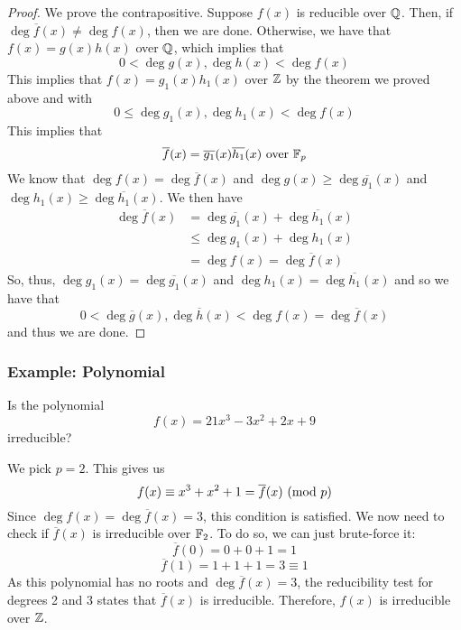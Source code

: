 \documentclass[letterpaper]{article}
\begin{document}
\begin{mdframed}[]
    \begin{proof}
        We prove the contrapositive. Suppose $f(x)$ is reducible over $\mathbb{Q}$. Then, if $\deg \overline{f}(x) \neq \deg f(x)$, then we are done. Otherwise, we have that $f(x) = g(x) h(x)$ over $\mathbb{Q}$, which implies that 
        \[0 < \deg g(x), \deg h(x) < \deg f(x)\]
        This implies that $f(x) = g_1 (x) h_1 (x)$ over $\mathbb{Z}$ by the theorem we proved above and with
        \[0 \leq \deg g_1 (x), \deg h_1 (x) < \deg f(x)\]
        This implies that 
        \[\overline{f}(x) = \overline{g_1}(x) \overline{h_1}(x) \text{ over } \mathbb{F}_p\]
        We know that $\deg f(x) = \deg \overline{f}(x)$ and $\deg g(x) \geq \deg \overline{g_1}(x)$ and $\deg h_1 (x) \geq \deg \overline{h_1}(x)$. We then have 
        \begin{equation*}
            \begin{aligned}
                \deg \overline{f}(x) &= \deg \overline{g_1}(x) + \deg \overline{h_1}(x) \\ 
                    &\leq \deg g_1 (x) + \deg h_1 (x) \\ 
                    &= \deg f(x) = \deg \overline{f}(x)
            \end{aligned}
        \end{equation*}
        So, thus, $\deg g_1 (x) = \deg \overline{g_1}(x)$ and $\deg h_1 (x) = \deg \overline{h_1}(x)$ and so we have that 
        \[0 < \deg \overline{g}(x), \deg \overline{h}(x) < \deg f(x) = \deg \overline{f}(x)\]
        and thus we are done. 
    \end{proof}
\end{mdframed}

\subsubsection{Example: Polynomial}
Is the polynomial
\[f(x) = 21x^3 - 3x^2 + 2x + 9\]
irreducible?

\begin{mdframed}[]
    We pick $p = 2$. This gives us 
    \[f(x) \equiv x^3 + x^2 + 1 = \overline{f}(x) \ (\mathrm{mod}\ p)\]
    Since $\deg f(x) = \deg \overline{f}(x) = 3$, this condition is satisfied. We now need to check if $\overline{f}(x)$ is irreducible over $\mathbb{F}_2$. To do so, we can just brute-force it:
    \[\overline{f}(0) = 0 + 0 + 1 = 1\]
    \[\overline{f}(1) = 1 + 1 + 1 = 3 \equiv 1\]
    As this polynomial has no roots and $\deg \overline{f}(x) = 3$, the reducibility test for degrees 2 and 3 states that $\overline{f}(x)$ is irreducible. Therefore, $f(x)$ is irreducible over $\mathbb{Z}$. 
\end{mdframed}
\end{document}
